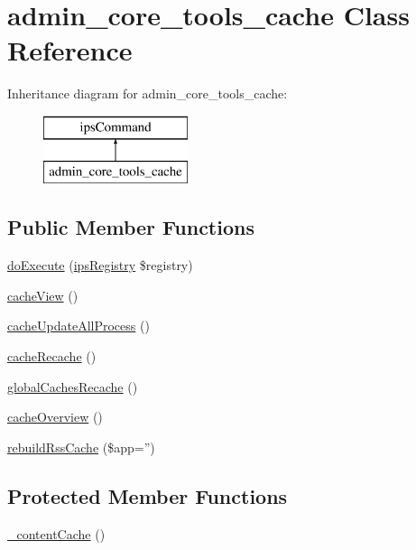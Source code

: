\hypertarget{classadmin__core__tools__cache}{\section{admin\-\_\-core\-\_\-tools\-\_\-cache Class Reference}
\label{classadmin__core__tools__cache}
}
Inheritance diagram for admin\-\_\-core\-\_\-tools\-\_\-cache\-:\begin{figure}[H]
\begin{center}
\leavevmode
\includegraphics[height=2.000000cm]{classadmin__core__tools__cache}
\end{center}
\end{figure}
\subsection*{Public Member Functions}
\begin{DoxyCompactItemize}
\item 
\hyperlink{classadmin__core__tools__cache_afbc4e912a0604b94d47d66744c64d8ba}{do\-Execute} (\hyperlink{classips_registry}{ips\-Registry} \$registry)
\item 
\hyperlink{classadmin__core__tools__cache_aab9f846616f09b21cf2b7cab90f57146}{cache\-View} ()
\item 
\hyperlink{classadmin__core__tools__cache_ad35c1e266483cfa39e1359f5f981f994}{cache\-Update\-All\-Process} ()
\item 
\hyperlink{classadmin__core__tools__cache_a3108712ad2c56183d334f67813e0077a}{cache\-Recache} ()
\item 
\hyperlink{classadmin__core__tools__cache_a7a58547f23bf1df4b2ffe18945f5a3db}{global\-Caches\-Recache} ()
\item 
\hyperlink{classadmin__core__tools__cache_a439d3b4193abd122a1648cea088fae67}{cache\-Overview} ()
\item 
\hyperlink{classadmin__core__tools__cache_ace16de1653ef5b3fa98a41156ddb1480}{rebuild\-Rss\-Cache} (\$app='')
\end{DoxyCompactItemize}
\subsection*{Protected Member Functions}
\begin{DoxyCompactItemize}
\item 
\hyperlink{classadmin__core__tools__cache_a8d0f2565f5361d7f741e53f9ba274b1e}{\-\_\-content\-Cache} ()
\end{DoxyCompactItemize}
